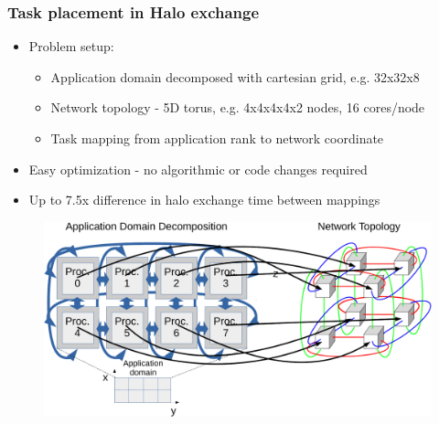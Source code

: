 \documentclass{beamer}
\begin{document}
\begin{frame}
\frametitle{Task placement in Halo exchange}
\begin{itemize}
\item Problem setup:
  \begin{itemize}
    \item Application domain decomposed with cartesian grid, e.g. 32x32x8
    \item Network topology - 5D torus, e.g. 4x4x4x4x2 nodes, 16 cores/node
    \item Task mapping from application rank to network coordinate
  \end{itemize}
\item Easy optimization - no algorithmic or code changes required
\item Up to 7.5x difference in halo exchange time between mappings
\end{itemize}
\vspace{-1.0em}
\begin{figure}
  \centering
  \includegraphics[width=0.75\linewidth]{../fig/halo-mapping}
\end{figure}
\end{frame}

\end{document}
